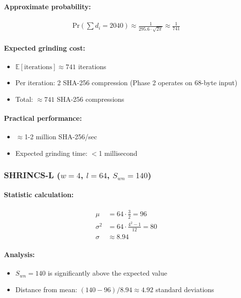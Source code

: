 \paragraph{Approximate probability:}
\begin{align}
    \text{Pr}\left(\sum d_i = 2040\right) \approx \frac{1}{295.6 \cdot \sqrt{2\pi}} \approx \frac{1}{741}
\end{align}

\paragraph{Expected grinding cost:}
\begin{itemize}
    \item $\mathbb{E}[\text{iterations}] \approx 741$ iterations
    \item Per iteration: 2 SHA-256 compression (Phase 2 operates on 68-byte input)
    \item Total: $\approx 741$ SHA-256 compressions
\end{itemize}

\paragraph{Practical performance:}
\begin{itemize}
    \item $\approx$1-2 million SHA-256/sec
    \item Expected grinding time: $<$1 millisecond
\end{itemize}

\subsubsection{SHRINCS-L ($w=4$, $l=64$, $S_{wn}=140$)}

\paragraph{Statistic calculation:}
\begin{align}
    \mu &= 64 \cdot \frac{3}{2} = 96 \\
    \sigma^2 &= 64 \cdot \frac{4^2-1}{12} = 80 \\
    \sigma &\approx 8.94
\end{align}

\paragraph{Analysis:}
\begin{itemize}
    \item $S_{wn} = 140$ is significantly above the expected value
    \item Distance from mean: $(140 - 96)/8.94 \approx 4.92$ standard deviations
\end{itemize}

